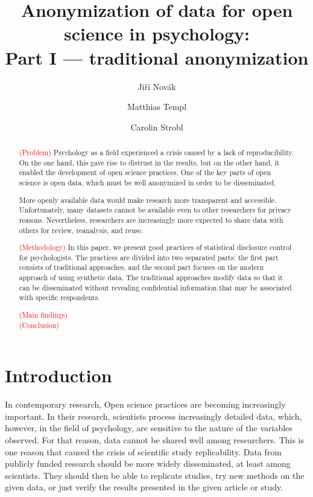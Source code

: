 \documentclass{article}
\title{Anonymization of data for open science in psychology: \\ 
       Part I — traditional anonymization
}
\author{Jiří Novák \and 
        Matthias Templ \and 
        Carolin Strobl
        }
\begin{document}
\maketitle

\begin{abstract}
\textcolor{red}{(Problem)} Psychology as a field experienced a crisis caused by a lack of reproducibility. 
On the one hand, this gave rise to distrust in the results, but on the other hand, it enabled the development of open science practices. 
One of the key parts of open science is open data, which must be well anonymized in order to be disseminated. 

More openly available data would make research more transparent and accessible. Unfortunately, many datasets cannot be available even to other researchers for privacy reasons. 
Nevertheless, researchers are increasingly more expected to share data with others for review, reanalysis, and reuse.

\textcolor{red}{(Methodology)} In this paper, we present good practices of statistical disclosure control for psychologists. The practices are divided into two separated parts: the first part consists of traditional approaches, and the second part focuses on the modern approach of using synthetic data.
The traditional approaches modify data so that it can be disseminated without revealing confidential information that may be associated with specific respondents. 

\textcolor{red}{(Main findings)} \\ 

\textcolor{red}{(Conclusion)} \\ 

\end{abstract}


\section{Introduction}

In contemporary research, Open science practices are becoming increasingly important. In their research, scientists process increasingly detailed data, which, however, in the field of psychology, are sensitive to the nature of the variables observed.
For that reason, data cannot be shared well among researchers. This is one reason that caused the crisis of scientific study replicability. Data from publicly funded research should be more widely disseminated, at least among scientists. They should then be able to replicate studies, try new methods on the given data, or just verify the results presented in the given article or study.
\newline
\end{document}
